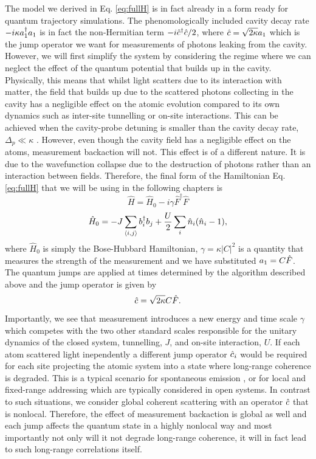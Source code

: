 The model we derived in Eq. \eqref{eq:fullH} is in fact already in a
form ready for quantum trajectory simulations. The phenomologically
included cavity decay rate $-i \kappa a^\dagger_1 a_1$ is in fact the
non-Hermitian term $-i \hat{c}^\dagger \hat{c} / 2$, where $\hat{c} = \sqrt{2 \kappa} a_1$
which is the jump operator we want for measurements of photons leaking
from the cavity. However, we will first simplify the system by
considering the regime where we can neglect the effect of the quantum
potential that builds up in the cavity. Physically, this means that
whilst light scatters due to its interaction with matter, the field
that builds up due to the scattered photons collecting in the cavity
has a negligible effect on the atomic evolution compared to its own
dynamics such as inter-site tunnelling or on-site interactions. This
can be achieved when the cavity-probe detuning is smaller than the
cavity decay rate, $\Delta_p \ll \kappa$
\cite{caballero2015}. However, even though the cavity field has a
negligible effect on the atoms, measurement backaction will not. This
effect is of a different nature. It is due to the wavefunction
collapse due to the destruction of photons rather than an interaction
between fields. Therefore, the final form of the Hamiltonian
Eq. \eqref{eq:fullH} that we will be using in the following chapters
is
\begin{equation}
  \hat{H} = \hat{H}_0 - i \gamma \hat{F}^\dagger \hat{F}
\end{equation}
\begin{equation}
  \hat{H}_0 = -J \sum_{\langle i, j \rangle} b^\dagger_i b_j + \frac{U}{2}
                \sum_i \hat{n}_i (\hat{n}_i - 1),
\end{equation}
where $\hat{H}_0$ is simply the Bose-Hubbard Hamiltonian,
$\gamma = \kappa |C|^2$ is a quantity that measures the strength of
the measurement and we have substituted $a_1 = C \hat{F}$. The
quantum jumps are applied at times determined by the algorithm
described above and the jump operator is given by
\begin{equation}
  \label{eq:jumpop}
  \hat{c} = \sqrt{2 \kappa} C \hat{F}.
\end{equation}
Importantly, we see that measurement introduces a new energy and time
scale $\gamma$ which competes with the two other standard scales
responsible for the unitary dynamics of the closed system, tunnelling,
$J$, and on-site interaction, $U$.  If each atom scattered light
inependently a different jump operator $\hat{c}_i$ would be required for
each site projecting the atomic system into a state where long-range
coherence is degraded. This is a typical scenario for spontaneous
emission \cite{pichler2010, sarkar2014}, or for local
\cite{syassen2008, kepesidis2012, vidanovic2014, bernier2014,
  daley2014} and fixed-range addressing \cite{ates2012, everest2014}
which are typically considered in open systems. In contrast to such
situations, we consider global coherent scattering with an operator
$\hat{c}$ that is nonlocal. Therefore, the effect of measurement backaction
is global as well and each jump affects the quantum state in a highly
nonlocal way and most importantly not only will it not degrade
long-range coherence, it will in fact lead to such long-range
correlations itself.

